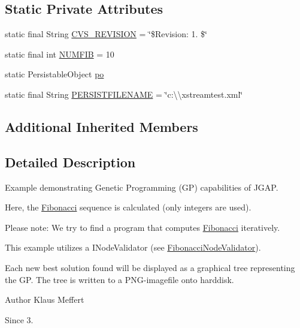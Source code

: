 \subsection*{Static Private Attributes}
\begin{DoxyCompactItemize}
\item 
static final String \hyperlink{classexamples_1_1gp_1_1_fibonacci_a2876f1c4cf701f5897daf66bbda39600}{C\-V\-S\-\_\-\-R\-E\-V\-I\-S\-I\-O\-N} = \char`\"{}\$Revision\-: 1. \$\char`\"{}
\item 
static final int \hyperlink{classexamples_1_1gp_1_1_fibonacci_a6915862fb14c91fe68fc43eea804474a}{N\-U\-M\-F\-I\-B} = 10
\item 
static Persistable\-Object \hyperlink{classexamples_1_1gp_1_1_fibonacci_a1e9780538a5848eca991e0e3600f40e5}{po}
\item 
static final String \hyperlink{classexamples_1_1gp_1_1_fibonacci_a9d97209b03872bbaa745ff440aa53ea4}{P\-E\-R\-S\-I\-S\-T\-F\-I\-L\-E\-N\-A\-M\-E} = \char`\"{}c\-:\textbackslash{}\textbackslash{}xstreamtest.\-xml\char`\"{}
\end{DoxyCompactItemize}
\subsection*{Additional Inherited Members}


\subsection{Detailed Description}
Example demonstrating Genetic Programming (G\-P) capabilities of J\-G\-A\-P.

Here, the \hyperlink{classexamples_1_1gp_1_1_fibonacci}{Fibonacci} sequence is calculated (only integers are used).

Please note\-: We try to find a program that computes \hyperlink{classexamples_1_1gp_1_1_fibonacci}{Fibonacci} iteratively.

This example utilizes a I\-Node\-Validator (see \hyperlink{classexamples_1_1gp_1_1_fibonacci_node_validator}{Fibonacci\-Node\-Validator}).

Each new best solution found will be displayed as a graphical tree representing the G\-P. The tree is written to a P\-N\-G-\/imagefile onto harddisk.

\begin{DoxyAuthor}{Author}
Klaus Meffert 
\end{DoxyAuthor}
\begin{DoxySince}{Since}
3. 
\end{DoxySince}


